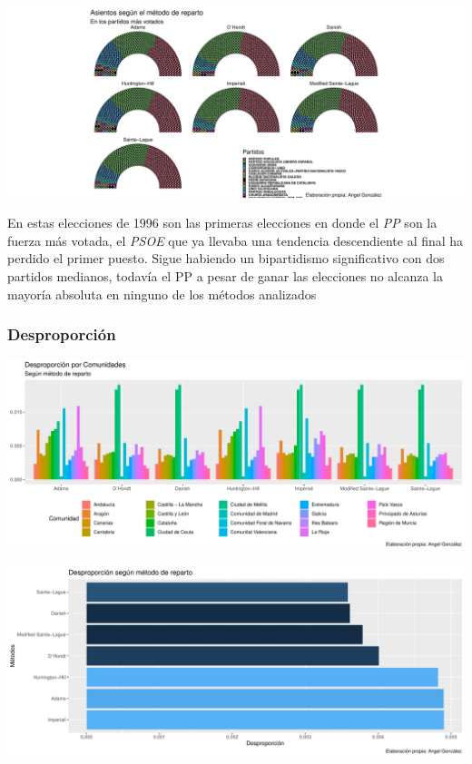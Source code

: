 \documentclass[12pt,a4paper,]{book}
\numberwithin{dummy}{section}
\theoremstyle{ocrenumbox}
\theoremstyle{blacknumex}
\theoremstyle{blacknumbox}
\theoremstyle{ocrenum}
\theoremstyle{ocrenum}
\begin{document}
\begin{center}\includegraphics[width=0.95\linewidth]{figurasR/unnamed-chunk-113-3} \end{center}

En estas elecciones de 1996 son las primeras elecciones en donde el
\emph{PP} son la fuerza más votada, el \emph{PSOE} que ya llevaba una
tendencia descendiente al final ha perdido el primer puesto. Sigue
habiendo un bipartidismo significativo con dos partidos medianos,
todavía el PP a pesar de ganar las elecciones no alcanza la mayoría
absoluta en ninguno de los métodos analizados

\hypertarget{desproporciuxf3n-6}{%
\subsubsection{Desproporción}\label{desproporciuxf3n-6}}

\begin{center}\includegraphics[width=0.95\linewidth]{figurasR/unnamed-chunk-114-1} \end{center}

\begin{center}\includegraphics[width=0.95\linewidth]{figurasR/unnamed-chunk-114-2} \end{center}
\end{document}
